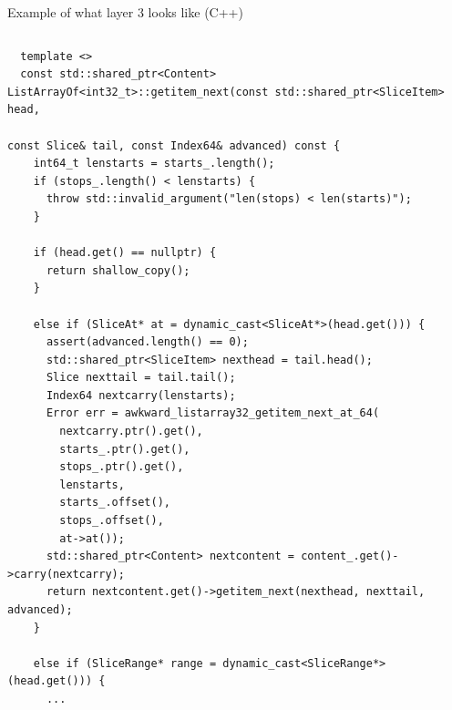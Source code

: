 \documentclass[aspectratio=169]{beamer}
\begin{document}
\begin{frame}[fragile]{Example of what layer 3 looks like (C++)}
\tiny
\vspace{0.05 cm}
\begin{columns}
\begin{verbatim}
  template <>
  const std::shared_ptr<Content> ListArrayOf<int32_t>::getitem_next(const std::shared_ptr<SliceItem> head,
                                                                    const Slice& tail, const Index64& advanced) const {
    int64_t lenstarts = starts_.length();
    if (stops_.length() < lenstarts) {
      throw std::invalid_argument("len(stops) < len(starts)");
    }

    if (head.get() == nullptr) {
      return shallow_copy();
    }

    else if (SliceAt* at = dynamic_cast<SliceAt*>(head.get())) {
      assert(advanced.length() == 0);
      std::shared_ptr<SliceItem> nexthead = tail.head();
      Slice nexttail = tail.tail();
      Index64 nextcarry(lenstarts);
      Error err = awkward_listarray32_getitem_next_at_64(
        nextcarry.ptr().get(),
        starts_.ptr().get(),
        stops_.ptr().get(),
        lenstarts,
        starts_.offset(),
        stops_.offset(),
        at->at());
      std::shared_ptr<Content> nextcontent = content_.get()->carry(nextcarry);
      return nextcontent.get()->getitem_next(nexthead, nexttail, advanced);
    }

    else if (SliceRange* range = dynamic_cast<SliceRange*>(head.get())) {
      ...
\end{verbatim}
\end{columns}
\end{frame}
\end{document}
